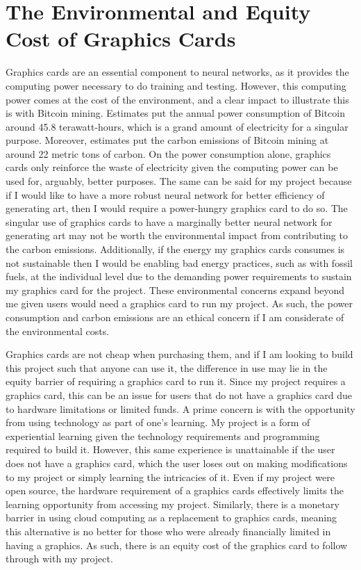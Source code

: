 \documentclass[10pt,twocolumn]{article}
\begin{document}
\section{The Environmental and Equity Cost of Graphics Cards}
Graphics cards are an essential component to neural networks, as it provides the computing power necessary to do training and testing. However, this computing power comes at the cost of the environment, and a clear impact to illustrate this is with Bitcoin mining. Estimates put the annual power consumption of Bitcoin around 45.8 terawatt-hours, which is a grand amount of electricity for a singular purpose. Moreover, estimates put the carbon emissions of Bitcoin mining at around 22 metric tons of carbon.\cite{stoll2019carbon} On the power consumption alone, graphics cards only reinforce the waste of electricity given the computing power can be used for, arguably, better purposes. The same can be said for my project because if I would like to have a more robust neural network for better efficiency of generating art, then I would require a power-hungry graphics card to do so. The singular use of graphics cards to have a marginally better neural network for generating art may not be worth the environmental impact from contributing to the carbon emissions. Additionally, if the energy my graphics cards consumes is not sustainable then I would be enabling bad energy practices, such as with fossil fuels, at the individual level due to the demanding power requirements to sustain my graphics card for the project. These environmental concerns expand beyond me given users would need a graphics card to run my project. As such, the power consumption and carbon emissions are an ethical concern if I am considerate of the environmental costs.

Graphics cards are not cheap when purchasing them, and if I am looking to build this project such that anyone can use it, the difference in use may lie in the equity barrier of requiring a graphics card to run it. Since my project requires a graphics card, this can be an issue for users that do not have a graphics card due to hardware limitations or limited funds. A prime concern is with the opportunity from using technology as part of one’s learning. My project is a form of experiential learning given the technology requirements and programming required to build it. However, this same experience is unattainable if the user does not have a graphics card, which the user loses out on making modifications to my project or simply learning the intricacies of it. Even if my project were open source, the hardware requirement of a graphics cards effectively limits the learning opportunity from accessing my project. Similarly, there is a monetary barrier in using cloud computing as a replacement to graphics cards, meaning this alternative is no better for those who were already financially limited in having a graphics. As such, there is an equity cost of the graphics card to follow through with my project.
\end{document}
